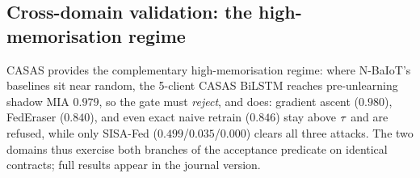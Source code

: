 \subsection{Cross-domain validation: the high-memorisation regime}
\label{sec:eval-casas}

CASAS provides the complementary high-memorisation regime: where
N-BaIoT's baselines sit near random, the 5-client CASAS BiLSTM reaches
pre-unlearning shadow MIA $0.979$, so the gate must \emph{reject}, and
does: gradient ascent ($0.980$), FedEraser ($0.840$), and even exact
naive retrain ($0.846$) stay above $\tau$ and are refused, while only
SISA-Fed ($0.499$/$0.035$/$0.000$) clears all three attacks. The two
domains thus exercise both branches of the acceptance predicate on
identical contracts; full results appear in the journal version.
